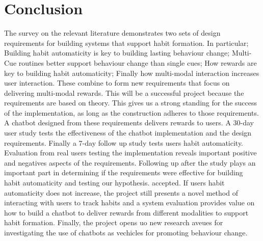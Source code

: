 
\newpage
\section{Conclusion}

The survey on the relevant literature demonstrates two sets of design requirements for building systems that support habit formation. In particular; Building habit automaticity is key to building lasting behaviour change; Multi-Cue routines better support behaviour change than single cues; How rewards are key to building habit automaticity; Finally how multi-modal interaction increases user interaction. These combine to form new requirements that focus on delivering multi-modal rewards.\newline
\newline
This will be a successful project because the requirements are based on theory. This gives us a strong standing for the success of the implementation, as long as the construction adheres to those requirements.\newline
\newline
A chatbot designed from these requirements delivers rewards to users. A 30-day user study tests the effectiveness of the chatbot implementation and the design requirements. Finally a 7-day follow up study tests users habit automaticity.\newline
\newline
Evaluation from real users testing the implementation reveals important positive and negatives aspects of the requirements. Following up after the study plays an important part in determining if the requirements were effective for building habit automaticity and testing our hypothesis. accepted. If users habit automaticity does not increase, the project still presents a novel method of interacting with users to track habits and a system evaluation provides value on how to build a chatbot to deliver rewards from different modalities to support habit formation. Finally, the project opens uo new research aveues for investigating the use of chatbots as vechicles for promoting behaviour change.
